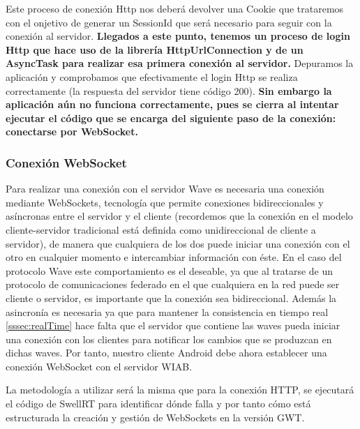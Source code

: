 	  Este proceso de conexión Http nos deberá devolver una Cookie que trataremos con el onjetivo de generar un SessionId que será necesario para seguir con la conexión al servidor. \textbf{Llegados a este punto, tenemos un proceso de login Http que hace uso de la librería HttpUrlConnection y de un AsyncTask para realizar esa primera conexión al servidor.} Depuramos la aplicación y comprobamos que efectivamente el login Http se realiza correctamente (la respuesta del servidor tiene código 200). \textbf{Sin embargo la aplicación aún no funciona correctamente, pues se cierra al intentar ejecutar el código que se encarga del siguiente paso de la conexión: conectarse por WebSocket.}    
    
    		\subsubsection{Conexión WebSocket}\label{sssec:conWave}
    
    Para realizar una conexión con el servidor Wave es necesaria una conexión mediante WebSockets\cite{ref:webSocket_ref}, tecnología que permite conexiones bidireccionales y asíncronas entre el servidor y el cliente (recordemos que la conexión en el modelo cliente-servidor tradicional está definida como unidireccional de cliente a servidor), de manera que cualquiera de los dos puede iniciar una conexión con el otro en cualquier momento e intercambiar información con éste. En el caso del protocolo Wave este comportamiento es el deseable, ya que al tratarse de un protocolo de comunicaciones federado en el que cualquiera en la red puede ser cliente o servidor, es importante que la conexión sea bidireccional. Además la asincronía es necesaria ya que para mantener la consistencia en tiempo real \ref{sssec:realTime} hace falta que el servidor que contiene las waves pueda iniciar una conexión con los clientes para notificar los cambios que se produzcan en dichas waves. Por tanto, nuestro cliente Android debe ahora establecer una conexión WebSocket con el servidor WIAB. 
    
    La metodología a utilizar será la misma que para la conexión HTTP, se ejecutará el código de SwellRT para identificar dónde falla y por tanto cómo está estructurada la creación y gestión de WebSockets en la versión GWT.
    
